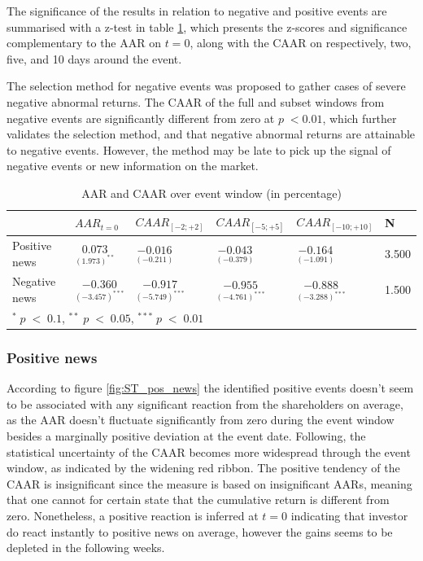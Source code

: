 The significance of the results in relation to negative and positive events are summarised with a z-test in table \ref{tab: ST_significace}, which presents the z-scores and significance complementary to the AAR on $t=0$, along with the CAAR on respectively, two, five, and 10 days around the event.  

The selection method for negative events was proposed to gather cases of severe negative abnormal returns. The CAAR of the full and subset windows from negative events are significantly different from zero at $p \; < 0.01$, which further validates the selection method, and that negative abnormal returns are attainable to negative events. However, the method may be late to pick up the signal of negative events or new information on the market.  

\begin{table}[ht]
\centering
\caption{AAR and CAAR over event window (in percentage)} 
\begin{tabular}{llllll}
   \hline  \hline
  & $AAR_{t=0}$ & $CAAR_{[-2;+2]}$ & $CAAR_{[-5;+5]}$ & $CAAR_{[-10;+10]}$ & N \\
 \hline
Positive news & $\underset{(1.973)^{**}}{0.073}$  & $\underset{(-0.211)}{-0.016}$    &  $\underset{(-0.379)}{-0.043}$ & $\underset{(-1.091)}{-0.164}$ & 3.500 \\ 
Negative news & $\underset{(-3.457)^{***}}{-0.360}$  & $\underset{(-5.749)^{***}}{-0.917}$    & $\underset{(-4.761)^{***}}{-0.955}$ & $\underset{(-3.288)^{***}}{-0.888}$ & 1.500\\ 
   \hline
   \multicolumn{5}{p{12cm}}{\footnotesize  $^* \; p\; <\; 0.1$, $ ^{**} \; p\; <\; 0.05$, $ ^{***} \; p\; <\; 0.01$  } \\ 
\end{tabular}
\label{tab: ST_significace}
\end{table}

\subsubsection{Positive news}

According to figure \ref{fig:ST_pos_news} the identified positive events doesn't seem to be associated with any significant reaction from the shareholders on average, as the AAR doesn't fluctuate significantly from zero during the event window besides a marginally positive deviation at the event date. Following, the statistical uncertainty of the CAAR becomes more widespread through the event window, as indicated by the widening red ribbon. The positive tendency of the CAAR is insignificant since the measure is based on insignificant AARs, meaning that one cannot for certain state that the cumulative return is different from zero. Nonetheless, a positive reaction is inferred at $t=0$ indicating that investor do react instantly to positive news on average, however the gains seems to be depleted in the following weeks.  

